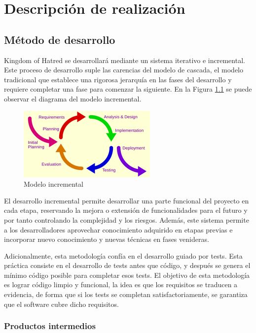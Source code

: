 \chapter{Descripción de realización}

\section{Método de desarrollo}

Kingdom of Hatred se desarrollará mediante un sistema iterativo e incremental. Este proceso de desarrollo suple las carencias del modelo de cascada, el modelo tradicional que establece una rigorosa jerarquía en las fases del desarrollo y requiere completar una fase para comenzar la siguiente. En la Figura \ref{fig:modeloI} se puede observar el diagrama del modelo incremental.

\begin{figure}[!htp]
 \centering
 \includegraphics{fig/modelo_incremental}
 \caption{Modelo incremental}
 \label{fig:modeloI}
\end{figure}

El desarrollo incremental permite desarrollar una parte funcional del proyecto en cada etapa, reservando la mejora o extensión de funcionalidades para el futuro y por tanto controlando la complejidad y los riesgos. Además, este sistema permite a los desarrolladores aprovechar conocimiento adquirido en etapas previas e incorporar nuevo conocimiento y nuevas técnicas en fases venideras.

Adicionalmente, esta metodología confía en el desarrollo guiado por tests. Esta práctica consiste en el desarrollo de tests antes que código, y después se genera el mínimo código posible para completar esos tests. El objetivo de esta metodología es lograr código limpio y funcional, la idea es que los requisitos se traducen a evidencia, de forma que si los tests se completan satisfactoriamente, se garantiza que el software cubre dicho requisitos.

\subsection{Productos intermedios}

